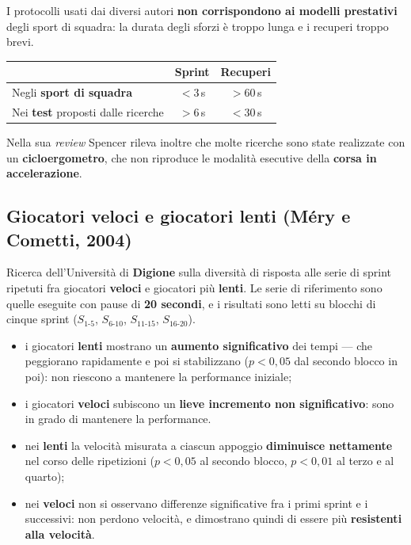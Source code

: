 I protocolli usati dai diversi autori \textbf{non corrispondono ai modelli prestativi} degli sport di
squadra: la durata degli sforzi è troppo lunga e i recuperi troppo brevi.

\begin{table}[htbp]
  \centering
  \small
  \renewcommand{\arraystretch}{1.3}
  \begin{tabularx}{\textwidth}{|X|c|c|}
    \hline
     & \textbf{Sprint} & \textbf{Recuperi} \\
    \hline
    Negli \textbf{sport di squadra} & $< 3$\,s & $> 60$\,s \\
    \hline
    Nei \textbf{test} proposti dalle ricerche & $> 6$\,s & $< 30$\,s \\
    \hline
  \end{tabularx}
\end{table}

Nella sua \textit{review} Spencer rileva inoltre che molte ricerche sono state realizzate con un
\textbf{cicloergometro}, che non riproduce le modalità esecutive della \textbf{corsa in
accelerazione}.

\subsection{Giocatori veloci e giocatori lenti (Méry e Cometti, 2004)}

Ricerca dell'Università di \textbf{Digione} sulla diversità di risposta alle serie di sprint ripetuti
fra giocatori \textbf{veloci} e giocatori più \textbf{lenti}. Le serie di riferimento sono quelle
eseguite con pause di \textbf{20 secondi}, e i risultati sono letti su blocchi di cinque sprint
($S_{1\text{-}5}$, $S_{6\text{-}10}$, $S_{11\text{-}15}$, $S_{16\text{-}20}$).

\begin{itemize}
  \item i giocatori \textbf{lenti} mostrano un \textbf{aumento significativo} dei tempi --- che
    peggiorano rapidamente e poi si stabilizzano ($p < 0{,}05$ dal secondo blocco in poi): non
    riescono a mantenere la performance iniziale;
  \item i giocatori \textbf{veloci} subiscono un \textbf{lieve incremento non significativo}: sono in
    grado di mantenere la performance.
\end{itemize}

\begin{itemize}
  \item nei \textbf{lenti} la velocità misurata a ciascun appoggio \textbf{diminuisce nettamente} nel
    corso delle ripetizioni ($p < 0{,}05$ al secondo blocco, $p < 0{,}01$ al terzo e al quarto);
  \item nei \textbf{veloci} non si osservano differenze significative fra i primi sprint e i
    successivi: non perdono velocità, e dimostrano quindi di essere più \textbf{resistenti alla
    velocità}.
\end{itemize}

